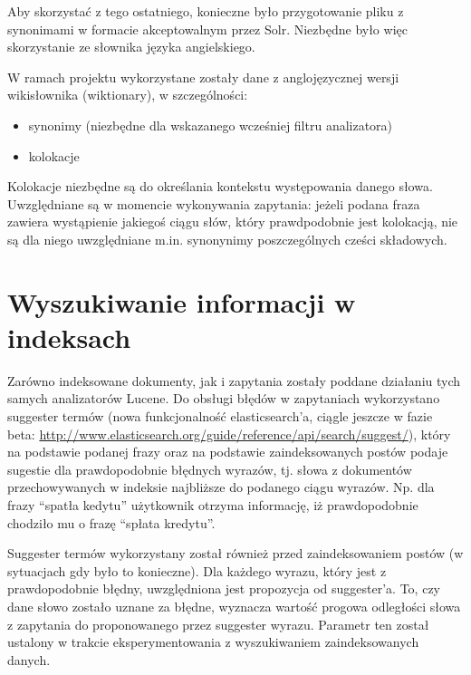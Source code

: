 \documentclass[runningheads]{llncs}
\begin{document}
Aby skorzystać z tego ostatniego, konieczne było przygotowanie pliku z
synonimami w formacie akceptowalnym przez Solr. Niezbędne było więc skorzystanie
ze słownika języka angielskiego.

W ramach projektu wykorzystane zostały dane z anglojęzycznej wersji wikisłownika
(wiktionary), w szczególności:
\begin{itemize}
  \item synonimy (niezbędne dla wskazanego wcześniej filtru analizatora)
  \item kolokacje
\end{itemize}

Kolokacje niezbędne są do określania kontekstu występowania danego słowa. 
Uwzględniane są w momencie wykonywania zapytania: jeżeli podana fraza zawiera
wystąpienie jakiegoś ciągu słów, który  prawdpodobnie jest kolokacją, nie są
dla niego uwzględniane m.in. synonynimy poszczególnych cześci składowych.

\section{Wyszukiwanie informacji w indeksach}
\label{sec:wyszukiwanie-informacji-w-indeksach}
Zarówno indeksowane dokumenty, jak i zapytania zostały poddane działaniu tych
samych analizatorów Lucene.
Do obsługi błędów w zapytaniach  wykorzystano suggester termów (nowa
funkcjonalność elasticsearch’a, ciągle jeszcze w fazie beta:
\url{http://www.elasticsearch.org/guide/reference/api/search/suggest/}), który
na podstawie podanej frazy oraz na podstawie zaindeksowanych  postów podaje
sugestie dla prawdopodobnie błędnych wyrazów, tj. słowa  z dokumentów
przechowywanych w indeksie najbliższe do podanego ciągu wyrazów. Np.  dla frazy
“spatła kedytu” użytkownik otrzyma informację, iż prawdopodobnie chodziło mu o
frazę “spłata kredytu”.

Suggester termów wykorzystany został również przed zaindeksowaniem postów (w
sytuacjach gdy było to konieczne).
Dla każdego wyrazu, który jest z prawdopodobnie błędny, uwzględniona jest
propozycja od suggester’a. To, czy dane słowo zostało uznane za błędne,
wyznacza wartość progowa odległości słowa z zapytania do  proponowanego przez
suggester wyrazu. Parametr ten został ustalony  w trakcie eksperymentowania z
wyszukiwaniem zaindeksowanych danych. 

\end{document}
